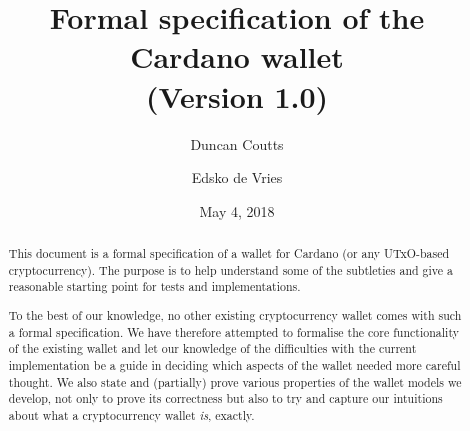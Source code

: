 \documentclass{article}
\theoremstyle{definition}{
  \newtheorem{lemma}{Lemma}[section] %
  \newtheorem{definition}[lemma]{Definition}
}
\theoremstyle{theorem}{
  \newtheorem{invariant}[lemma]{Invariant}
  \newtheorem{proofobligation}[lemma]{Proof Obligation}
}
\numberwithin{equation}{lemma}
\begin{document}
\title{Formal specification of the Cardano wallet \\ \small{(Version 1.0)}}
\author{Duncan Coutts \and Edsko de Vries}
\date{May 4, 2018}

\maketitle

\begin{abstract}
This document is a formal specification of a wallet for Cardano (or any
UTxO-based cryptocurrency). The purpose is to help understand some of the
subtleties and give a reasonable starting point for tests and implementations.

To the best of our knowledge, no other existing cryptocurrency wallet comes with
such a formal specification. We have therefore attempted to formalise the core
functionality of the existing wallet and let our knowledge of the difficulties
with the current implementation be a guide in deciding which aspects of the
wallet needed more careful thought. We also state and (partially) prove various
properties of the wallet models we develop, not only to prove its correctness
but also to try and capture our intuitions about what a cryptocurrency wallet
\emph{is}, exactly.
\end{abstract}

\tableofcontents
\listoffigures
\end{document}
